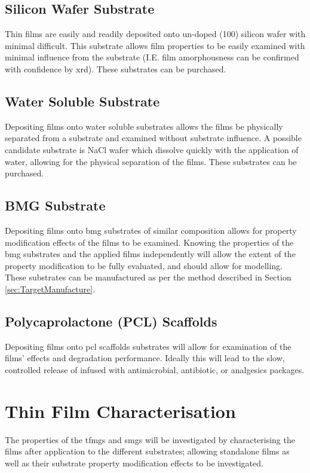 \documentclass[a4paper,12pt,oneside]{report}%
\begin{document}
\subsection{Silicon Wafer Substrate}
Thin films are easily and readily deposited onto un-doped (100) silicon wafer with minimal difficult. This substrate allows film properties to be easily examined with minimal influence from the substrate (I.E. film amorphousness can be confirmed with confidence by \acrshort{xrd}). These substrates can be purchased. 

\subsection{Water Soluble Substrate} 
Depositing films onto water soluble substrates allows the films be physically separated from a substrate and examined without substrate influence. A possible candidate substrate is NaCl wafer which dissolve quickly with the application of water, allowing for the physical separation of the films. These substrates can be purchased. 

\subsection{BMG Substrate}
Depositing films onto \gls{bmg} substrates of similar composition allows for property modification effects of the films to be examined. Knowing the properties of the \gls{bmg} substrates and the applied films independently will allow the extent of the property modification to be fully evaluated, and should allow for modelling. These substrates can be manufactured as per the method described in Section \ref{sec:TargetManufacture}. 

\subsection{Polycaprolactone (PCL) Scaffolds}
Depositing films onto \gls{pcl} scaffolds substrates will allow for examination of the films' effects and degradation performance. Ideally this will lead to the slow, controlled release of infused with antimicrobial, antibiotic, or analgesics packages.

\section{Thin Film Characterisation}
The properties of the \glspl{tfmg} and \glspl{smg} will be investigated by characterising the films after application to the different substrates; allowing standalone films as well as their substrate property modification effects to be investigated. 
\end{document}

